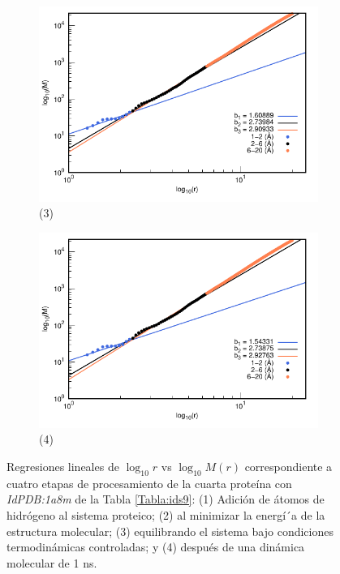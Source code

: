 \begin{figure}[H]
	\vspace{0cm} %
	
	\hspace{-0.3cm} 
	\begin{subfigure}{0.49\textwidth}
		\centering
		\includegraphics[width=\linewidth,page=1]{graphs/PDBs/1a8m/1a8mEq.pdf}
		\caption{(3)}
	\end{subfigure}
	\hspace{0.2cm}
	\begin{subfigure}{0.49\textwidth} %
		\centering
		\includegraphics[width=\linewidth,page=1]{graphs/PDBs/1a8m/1a8m1ns.pdf}
		\caption{(4)}
	\end{subfigure}
	\caption{Regresiones lineales de $\log_{10}r$ vs $\log_{10}M(r)$ correspondiente a cuatro etapas de procesamiento de la cuarta prote\'{i}na con \textit{IdPDB:1a8m} de la Tabla \ref{Tabla:ids9}: (1) Adici\'{o}n de \'{a}tomos de hidr\'{o}geno al sistema proteico; (2) al minimizar la energ\'{i´}a de la estructura molecular; (3) equilibrando el sistema bajo condiciones termodin\'{a}micas controladas; y (4) despu\'{e}s de una din\'{a}mica molecular de 1 ns.}
	\label{fig:1a8m}
\end{figure}

